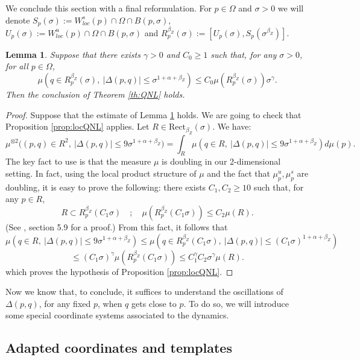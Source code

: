 \documentclass[a4paper]{article}
\newtheorem{lemma}[theorem]{Lemma}
\theoremstyle{definition}
\begin{document}
We conclude this section with a final reformulation. For $p \in \Omega$ and $\sigma>0$ we will denote $S_p(\sigma) := W^s_{loc}(p) \cap \Omega \cap B(p,\sigma)$, $U_p(\sigma) := W^u_{loc}(p) \cap \Omega \cap B(p,\sigma)$ and $R_p^{\beta_Z}(\sigma) := [U_p(\sigma),S_p(\sigma^{\beta_Z})]$.

\begin{lemma}\label{lem:locQNL}
Suppose that there exists $\gamma>0$ and $C_0 \geq 1$ such that, for any $\sigma > 0$, for all $p \in \Omega$,  $$ \mu( q \in R_p^{\beta_Z}(\sigma) , \ |\Delta(p,q)| \leq \sigma^{1+\alpha+\beta_Z} ) \leq C_0 \mu(R_p^{\beta_Z}(\sigma))\sigma^\gamma . $$
Then the conclusion of Theorem  \ref{th:QNL} holds.
\end{lemma}

\begin{proof}
Suppose that the estimate of Lemma \ref{lem:locQNL} holds. We are going to check that Proposition \ref{prop:locQNL} applies. Let $R \in \text{Rect}_{\beta_Z}(\sigma)$. We have:
$$ \mu^{\otimes 2}\Big( (p,q) \in R^2, \ |\Delta(p,q)| \leq 9 \sigma^{1+\alpha+\beta_Z} \Big) = \int_{R} \mu(q \in R, \ |\Delta(p,q)| \leq 9 \sigma^{1+\alpha+\beta_Z}) d\mu(p). $$
The key fact to use is that the measure $\mu$ is doubling in our 2-dimensional setting. In fact, using the local product structure of $\mu$ and the fact that $\mu_p^u,\mu_p^s$ are doubling, it is easy to prove the following: there exists $C_1,C_2 \geq 10$ such that, for any $p \in R$, $$ R \subset R_p^{\beta_Z}(C_1 \sigma) \quad ; \quad \mu(R_p^{\beta_Z}(C_1 \sigma)) \leq C_2 \mu(R). $$
(See \cite{Le24}, section 5.9 for a proof.)
From this fact, it follows that
$$ \mu(q \in R, \ |\Delta(p,q)| \leq 9\sigma^{1+\alpha+\beta_Z}) \leq \mu(q \in R_p^{\beta_Z}(C_1 \sigma), \ |\Delta(p,q)| \leq (C_1 \sigma)^{1+\alpha+\beta_Z}) $$
$$ \leq (C_1 \sigma)^\gamma \mu(R_p^{\beta_Z}(C_1 \sigma)) \leq C_1^\gamma C_2 \sigma^\gamma \mu(R). $$
which proves the hypothesis of Proposition \ref{prop:locQNL}.
\end{proof}

Now we know that, to conclude, it suffices to understand the oscillations of $\Delta(p,q)$, for any fixed $p$, when $q$ gets close to $p$. To do so, we will introduce some special coordinate systems associated to the dynamics.

\subsection{Adapted coordinates and templates}
\end{document}
